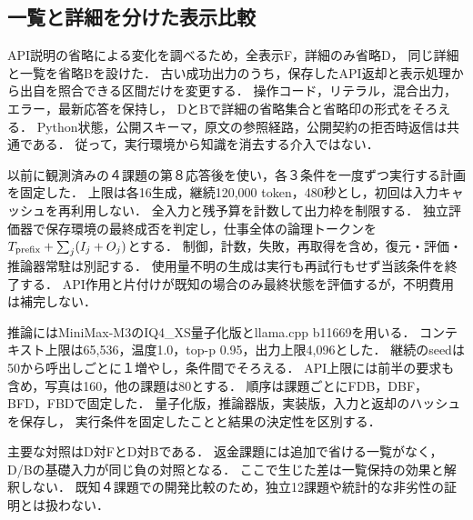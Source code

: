 \subsection{一覧と詳細を分けた表示比較}
API説明の省略による変化を調べるため，全表示F，詳細のみ省略D，
同じ詳細と一覧を省略Bを設けた．
古い成功出力のうち，保存したAPI返却と表示処理から出自を照合できる区間だけを変更する．
操作コード，リテラル，混合出力，エラー，最新応答を保持し，
DとBで詳細の省略集合と省略印の形式をそろえる．
Python状態，公開スキーマ，原文の参照経路，公開契約の拒否時返信は共通である．
従って，実行環境から知識を消去する介入ではない．

以前に観測済みの４課題の第８応答後を使い，各３条件を一度ずつ実行する計画を固定した．
上限は各16生成，継続120,000 token，480秒とし，初回は入力キャッシュを再利用しない．
全入力と残予算を計数して出力枠を制限する．
独立評価器で保存環境の最終成否を判定し，仕事全体の論理トークンを
$T_{\rm prefix}+\sum_j(I_j+O_j)$とする．
制御，計数，失敗，再取得を含め，復元・評価・推論器常駐は別記する．
使用量不明の生成は実行も再試行もせず当該条件を終了する．
API作用と片付けが既知の場合のみ最終状態を評価するが，不明費用は補完しない．

推論にはMiniMax-M3のIQ4\_XS量子化版とllama.cpp b11669を用いる．
コンテキスト上限は65,536，温度1.0，top-p 0.95，出力上限4,096とした．
継続のseedは50から呼出しごとに１増やし，条件間でそろえる．
API上限には前半の要求も含め，写真は160，他の課題は80とする．
順序は課題ごとにFDB，DBF，BFD，FBDで固定した．
量子化版，推論器版，実装版，入力と返却のハッシュを保存し，
実行条件を固定したことと結果の決定性を区別する．

主要な対照はD対FとD対Bである．
返金課題には追加で省ける一覧がなく，D/Bの基礎入力が同じ負の対照となる．
ここで生じた差は一覧保持の効果と解釈しない．
既知４課題での開発比較のため，独立12課題や統計的な非劣性の証明とは扱わない．
